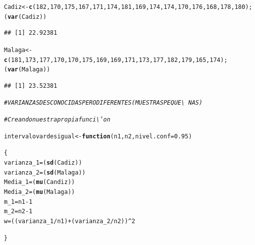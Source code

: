 \documentclass[12pt,letterpaper]{article}\usepackage[]{graphicx}\usepackage[]{color}
\makeatletter
\newcommand{\hlnum}[1]{\textcolor[rgb]{0.686,0.059,0.569}{#1}}%
\newcommand{\hlcom}[1]{\textcolor[rgb]{0.678,0.584,0.686}{\textit{#1}}}%
\newcommand{\hlopt}[1]{\textcolor[rgb]{0,0,0}{#1}}%
\newcommand{\hlstd}[1]{\textcolor[rgb]{0.345,0.345,0.345}{#1}}%
\newcommand{\hlkwa}[1]{\textcolor[rgb]{0.161,0.373,0.58}{\textbf{#1}}}%
\newcommand{\hlkwb}[1]{\textcolor[rgb]{0.69,0.353,0.396}{#1}}%
\newcommand{\hlkwc}[1]{\textcolor[rgb]{0.333,0.667,0.333}{#1}}%
\newcommand{\hlkwd}[1]{\textcolor[rgb]{0.737,0.353,0.396}{\textbf{#1}}}%
\newenvironment{kframe}{%
 \def\at@end@of@kframe{}%
 \ifinner\ifhmode%
  \def\at@end@of@kframe{\end{minipage}}%
  \begin{minipage}{\columnwidth}%
 \fi\fi%
 \def\FrameCommand##1{\hskip\@totalleftmargin \hskip-\fboxsep
 \colorbox{shadecolor}{##1}\hskip-\fboxsep
     \hskip-\linewidth \hskip-\@totalleftmargin \hskip\columnwidth}%
 \MakeFramed {\advance\hsize-\width
   \@totalleftmargin\z@ \linewidth\hsize
   \@setminipage}}%
 {\par\unskip\endMakeFramed%
 \at@end@of@kframe}
\newenvironment{knitrout}{}{} %
\makeatother
\begin{document}
\begin{knitrout}
\color{fgcolor}\begin{kframe}
\begin{alltt}
\hlstd{Cadiz} \hlkwb{<-} \hlkwd{c} \hlstd{(}\hlnum{182}\hlstd{,} \hlnum{170}\hlstd{,} \hlnum{175}\hlstd{,} \hlnum{167}\hlstd{,} \hlnum{171}\hlstd{,}  \hlnum{174}\hlstd{,}  \hlnum{181}\hlstd{,}  \hlnum{169}\hlstd{,}  \hlnum{174}\hlstd{,}  \hlnum{174}\hlstd{,}  \hlnum{170}\hlstd{,}  \hlnum{176}\hlstd{,} \hlnum{168}\hlstd{,} \hlnum{178}\hlstd{,}  \hlnum{180}\hlstd{);}
\hlstd{(}\hlkwd{var}\hlstd{(Cadiz))}
\end{alltt}
\begin{verbatim}
## [1] 22.92381
\end{verbatim}
\begin{alltt}
\hlstd{Malaga} \hlkwb{<-} \hlkwd{c} \hlstd{(}\hlnum{181}\hlstd{,} \hlnum{173}\hlstd{,} \hlnum{177}\hlstd{,} \hlnum{170}\hlstd{,} \hlnum{170}\hlstd{,}  \hlnum{175}\hlstd{,}  \hlnum{169}\hlstd{,}  \hlnum{169}\hlstd{,}  \hlnum{171}\hlstd{,}  \hlnum{173}\hlstd{,}  \hlnum{177}\hlstd{,}  \hlnum{182}\hlstd{,} \hlnum{179}\hlstd{,} \hlnum{165}\hlstd{,}  \hlnum{174}\hlstd{);}
\hlstd{(}\hlkwd{var}\hlstd{(Malaga))}
\end{alltt}
\begin{verbatim}
## [1] 23.52381
\end{verbatim}
\begin{alltt}
\hlcom{# VARIANZAS DESCONOCIDAS PERO DIFERENTES (MUESTRAS PEQUE\textbackslash{}~NAS)}

\hlcom{# Creando nuestra propia funci\textbackslash{}'on}

\hlstd{intervalovardesigual} \hlkwb{<-} \hlkwa{function}\hlstd{(}\hlkwc{n1}\hlstd{,} \hlkwc{n2}\hlstd{,} \hlkwc{nivel.conf}\hlstd{=}\hlnum{0.95}\hlstd{)}

\hlstd{\{}
  \hlstd{varianza_1} \hlkwb{=} \hlstd{(}\hlkwd{sd}\hlstd{(Cadiz))}
  \hlstd{varianza_2} \hlkwb{=} \hlstd{(}\hlkwd{sd}\hlstd{(Malaga))}
  \hlstd{Media_1} \hlkwb{=} \hlstd{(}\hlkwd{mu}\hlstd{(Candiz))}
  \hlstd{Media_2} \hlkwb{=} \hlstd{(}\hlkwd{mu}\hlstd{(Malaga))}
  \hlstd{m_1} \hlkwb{=} \hlstd{n1} \hlopt{-} \hlnum{1}
  \hlstd{m_2} \hlkwb{=} \hlstd{n2} \hlopt{-} \hlnum{1}
  \hlstd{w} \hlkwb{=} \hlstd{((varianza_1}\hlopt{/}\hlstd{n1)} \hlopt{+} \hlstd{(varianza_2}\hlopt{/}\hlstd{n2))}\hlopt{^}\hlnum{2}



\hlstd{\}}
\end{alltt}
\end{kframe}
\end{knitrout}
\end{document}
